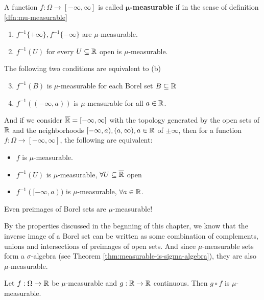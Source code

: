 \begin{dfn}[]
  A function $f: \Omega \to [-\infty,\infty]$ is called \textbf{$\bm{\mu}$-measurable} if in the sense of definition \ref{dfn:mu-measurable}
  \begin{enumerate}
    \item $f^{-1} \{+ \infty\}, f^{-1}\{-\infty\}$ are $\mu$-measurable.
    \item$f^{-1}(U)$ for every $U \subseteq \mathbb{R}$ open is $\mu$-measurable.
  \end{enumerate}
\end{dfn}

\begin{rem}[]
  The following two conditions are equivalent to (b)
\begin{enumerate}
  \setcounter{enumi}{2}
  \item $f^{-1}(B)$ is $\mu$-measurable for each Borel set $B \subseteq \mathbb{R}$
  \item $f^{-1}((-\infty,a))$ is $\mu$-measurable for all $a \in \mathbb{R}$.
\end{enumerate}


And if we consider $\overline{\mathbb{R}} = [-\infty,\infty]$ with the topology generated by the open sets of $\mathbb{R}$ and the neighborhoods $[-\infty,a), (a,\infty), a \in \mathbb{R}$ of $\pm \infty$,
then for a function
$f: \Omega \to [-\infty,\infty]$,
the following are equivalent:
\begin{itemize}
  \item $f$ is $\mu$-measurable.
  \item $f^{-1}(U)$ is $\mu$-measurable, $\forall  U \subseteq \overline{\mathbb{R}}$ open
  \item $f^{-1}([-\infty,a))$ is $\mu$-measurable, $\forall  a \in \mathbb{R}$.
\end{itemize}
\end{rem}

\begin{rem}[]
  Even preimages of Borel sets are $\mu$-measurable!

  By the properties discussed in the begnning of this chapter, we know that the inverse image of a Borel set can be written as some combination of complements, unions and intersections of preimages of open sets.
  And since $\mu$-measurable sets form a $\sigma$-algebra (see Theorem \ref{thm:measurable-is-sigma-algebra}), they are also $\mu$-measurable.
\end{rem}

\begin{ex}[]
Let $f: \Omega \to \mathbb{R}$ be $\mu$-measurable and $g: \mathbb{R} \to \mathbb{R}$ continuous. Then $g \circ f$ is $\mu$-measurable.
\end{ex}



